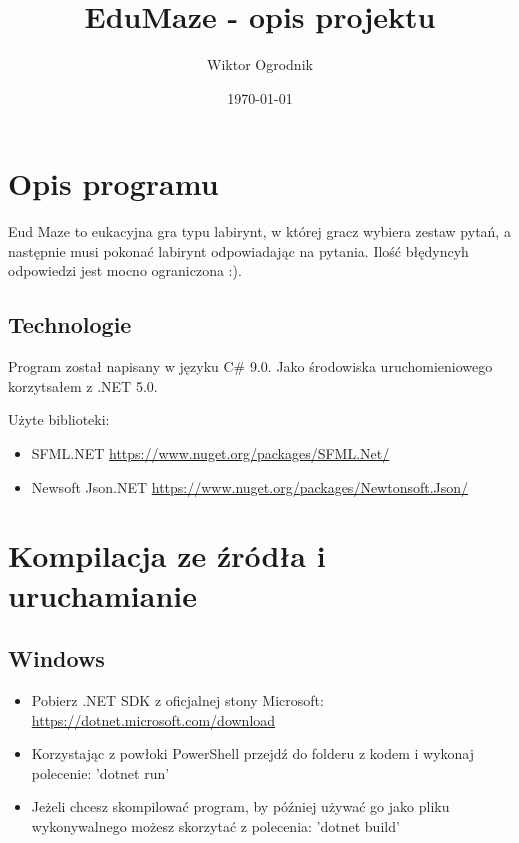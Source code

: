 \documentclass[a4paper]{article}
\author{Wiktor Ogrodnik}
\title{EduMaze - opis projektu}
\date{\today}
\begin{document}
\maketitle

\section{Opis programu}

Eud Maze to eukacyjna gra typu labirynt, w której gracz wybiera zestaw pytań, a następnie musi pokonać labirynt odpowiadając na pytania. Ilość błędyncyh odpowiedzi jest mocno ograniczona :).

\subsection{Technologie}
Program został napisany w języku C\# 9.0. Jako środowiska uruchomieniowego korzytsałem z .NET 5.0.

Użyte biblioteki:
\begin{itemize}
    \item SFML.NET \url{https://www.nuget.org/packages/SFML.Net/}
    \item Newsoft Json.NET \url{https://www.nuget.org/packages/Newtonsoft.Json/}
\end{itemize}

\section{Kompilacja ze źródła i uruchamianie}

\subsection{Windows}
\begin{itemize}
    \item Pobierz .NET SDK z oficjalnej stony Microsoft: \url{https://dotnet.microsoft.com/download}
    \item Korzystając z powłoki PowerShell przejdź do folderu z kodem i wykonaj polecenie: 'dotnet run'
    \item Jeżeli chcesz skompilować program, by później używać go jako pliku wykonywalnego możesz skorzytać z polecenia: 'dotnet build'
\end{itemize}
\end{document}

